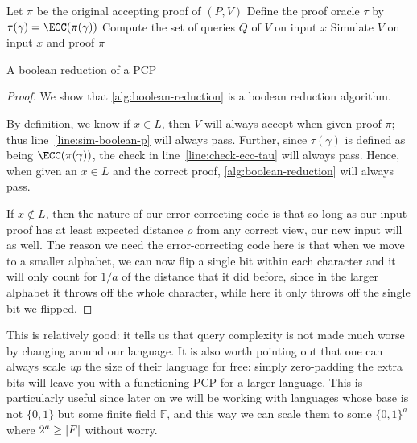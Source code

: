 \documentclass[english,12pt]{reedthesis}
\theoremstyle{plain}
\theoremstyle{definition}
\theoremstyle{remark}
\DeclarePairedDelimiter{\abs}{\lvert}{\rvert}
\begin{document}
\begin{algorithm}[htbp]
  Let $\pi$ be the original accepting proof of $(P, V)$\;
  Define the proof oracle $\tau$ by $\tau(\gamma) = \ECC(\pi(\gamma))$\;
  \KwRet{$(\pi, \tau)$}\;
  Compute the set of queries $Q$ of $V$ on input $x$\;
  Simulate $V$ on input $x$ and proof $\pi$\;
  \Accept\;
  \caption{A boolean reduction of a PCP~\cite[Construction 3.6]{GOS25}}\label{alg:boolean-reduction}
\end{algorithm}

\begin{proof}
  We show that \cref{alg:boolean-reduction} is a boolean reduction algorithm.

  By definition, we know if $x \in L$, then $V$ will always accept when given
  proof $\pi$; thus line~\ref{line:sim-boolean-p} will always pass. Further, since
  $\tau(\gamma)$ is defined as being $\ECC(\pi(\gamma))$, the check in
  line~\ref{line:check-ecc-tau} will always pass. Hence, when given an $x \in L$
  and the correct proof, \cref{alg:boolean-reduction} will always pass.

  If $x \notin L$, then the nature of our error-correcting code is that so long as
  our input proof has at least expected distance $\rho$ from any correct view, our
  new input will as well. The reason we need the error-correcting code here is
  that when we move to a smaller alphabet, we can now flip a single bit within
  each character and it will only count for $1/a$ of the distance that it did
  before, since in the larger alphabet it throws off the whole character, while
  here it only throws off the single bit we flipped.
\end{proof}

This is relatively good: it tells us that query complexity is not made much
worse by changing around our language. It is also worth pointing out that one
can always scale \emph{up} the size of their language for free: simply
zero-padding the extra bits will leave you with a functioning PCP for a larger
language. This is particularly useful since later on we will be working with
languages whose base is not $\{0, 1\}$ but some finite field $\mathbb{F}$, and
this way we can scale them to some $\{0, 1\}^{a}$ where $2^{a} \ge \abs{F}$
without worry.
\end{document}
